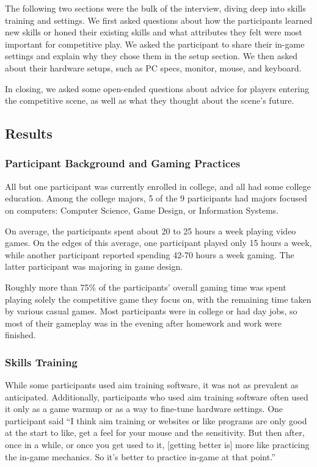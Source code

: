 \documentclass[11pt,manuscript,screen,review]{acmart} %
\begin{document}
The following two sections were the bulk of the interview, diving deep into skills training and settings. We first asked questions about how the participants learned new skills or honed their existing skills and what attributes they felt were most important for competitive play. We asked the participant to share their in-game settings and explain why they chose them in the setup section. We then asked about their hardware setups, such as PC specs, monitor, mouse, and keyboard. 

In closing, we asked some open-ended questions about advice for players entering the competitive scene, as well as what they thought about the scene’s future. 

\subsection{Results}
\subsubsection{Participant Background and Gaming Practices}

All but one participant was currently enrolled in college, and all had some college education. Among the college majors, 5 of the 9 participants had majors focused on computers: Computer Science, Game Design, or Information Systems.

On average, the participants spent about 20 to 25 hours a week playing video games. On the edges of this average, one participant played only 15 hours a week, while another participant reported spending 42-70 hours a week gaming. The latter participant was majoring in game design. 

Roughly more than 75\% of the participants’ overall gaming time was spent playing solely the competitive game they focus on, with the remaining time taken by various casual games. Most participants were in college or had day jobs, so most of their gameplay was in the evening after homework and work were finished. 

\subsubsection{Skills Training}

While some participants used aim training software, it was not as prevalent as anticipated. Additionally, participants who used aim training software often used it only as a game warmup or as a way to fine-tune hardware settings. One participant said “I think aim training or websites or like programs are only good at the start to like, get a feel for your mouse and the sensitivity. But then after, once in a while, or once you get used to it, [getting better is] more like practicing the in-game mechanics. So it's better to practice in-game at that point.”
\end{document}
